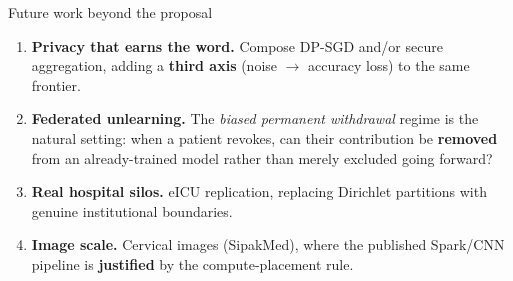 \documentclass[aspectratio=169, 11pt]{beamer}
\begin{document}
\begin{frame}{Future work beyond the proposal}
\begin{enumerate}\setlength\itemsep{0.45em}
\item \textbf{Privacy that earns the word.} Compose DP-SGD and/or secure
      aggregation, adding a \textbf{third axis} (noise $\rightarrow$ accuracy
      loss) to the same frontier.
\item \textbf{Federated unlearning.} The \emph{biased permanent withdrawal}
      regime is the natural setting: when a patient revokes, can their
      contribution be \textbf{removed} from an already-trained model rather
      than merely excluded going forward?
\item \textbf{Real hospital silos.} eICU replication, replacing Dirichlet
      partitions with genuine institutional boundaries.
\item \textbf{Image scale.} Cervical images (SipakMed), where the published
      Spark/CNN pipeline is \textbf{justified} by the compute-placement rule.
\end{enumerate}
\end{frame}
\end{document}
